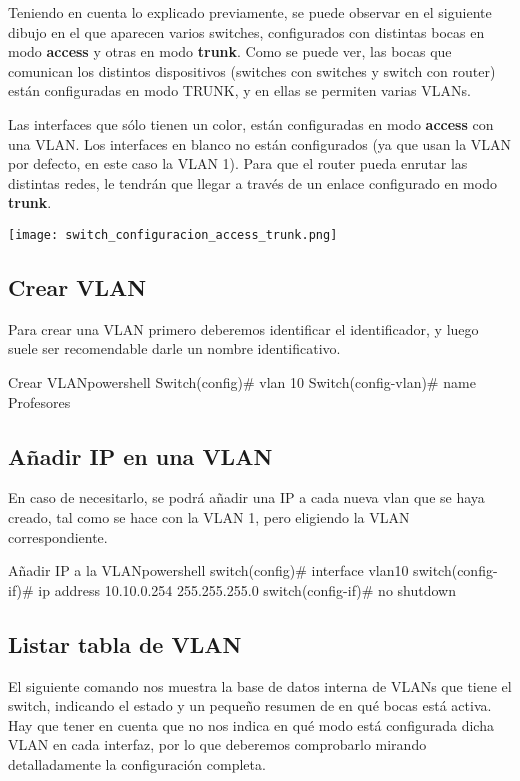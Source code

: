 Teniendo en cuenta lo explicado previamente, se puede observar en el siguiente dibujo en el que aparecen varios switches, configurados con distintas bocas en modo \textbf{access} y otras en modo \textbf{trunk}. Como se puede ver, las bocas que comunican los distintos dispositivos (switches con switches y switch con router) están configuradas en modo TRUNK, y en ellas se permiten varias VLANs.

Las interfaces que sólo tienen un color, están configuradas en modo \textbf{access} con una VLAN. Los interfaces en blanco no están configurados (ya que usan la VLAN por defecto, en este caso la VLAN 1). Para que el router pueda enrutar las distintas redes, le tendrán que llegar a través de un enlace configurado en modo \textbf{trunk}.
\textbf{}

\begin{center}
    \vspace{-10pt}
    \texttt{[image: switch\_configuracion\_access\_trunk.png]}
    \vspace{-10pt}
\end{center}


\subsection{Crear VLAN}
Para crear una VLAN primero deberemos identificar el identificador, y luego suele ser recomendable darle un nombre identificativo.

\begin{mycode}{Crear VLAN}{powershell}{}
Switch(config)# vlan 10
Switch(config-vlan)# name Profesores
\end{mycode}

\subsection{Añadir IP en una VLAN}
En caso de necesitarlo, se podrá añadir una IP a cada nueva vlan que se haya creado, tal como se hace con la VLAN 1, pero eligiendo la VLAN correspondiente.

\begin{mycode}{Añadir IP a la VLAN}{powershell}{}
switch(config)# interface vlan10
switch(config-if)# ip address 10.10.0.254 255.255.255.0
switch(config-if)# no shutdown
\end{mycode}

\subsection{Listar tabla de VLAN}
El siguiente comando nos muestra la base de datos interna de VLANs que tiene el switch, indicando el estado y un pequeño resumen de en qué bocas está activa. Hay que tener en cuenta que no nos indica en qué modo está configurada dicha VLAN en cada interfaz, por lo que deberemos comprobarlo mirando detalladamente la configuración completa.

